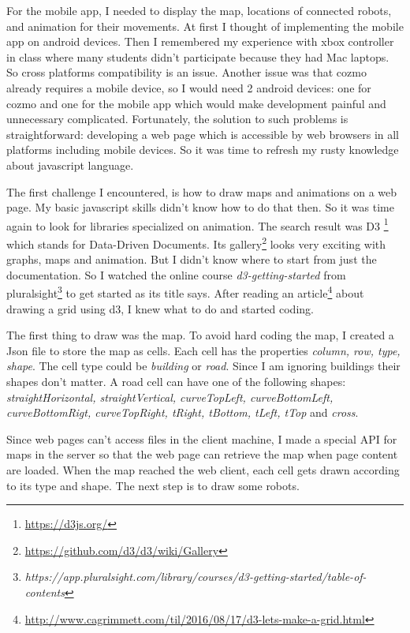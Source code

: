 \documentclass[12pt,a4paper]{article}
\begin{document}
For the mobile app, I needed to display the map, locations of connected robots, and animation for their movements. At first I thought of implementing the mobile app on android devices. Then I remembered my experience with xbox controller in class where many students didn't participate because they had Mac laptops. So cross platforms compatibility is an issue.  Another issue was that cozmo already requires a mobile device, so I would need 2 android devices: one for cozmo and one for the mobile app which would make development painful and unnecessary complicated. Fortunately,  the solution to such problems is straightforward: developing a web page which is accessible by web browsers in all platforms including mobile devices. So it was time to refresh my rusty knowledge about javascript language. 


The first challenge I encountered, is how to draw maps and animations on a web page. My basic javascript skills didn't know how to do that then. So it was time again to look for libraries specialized on animation. The search result was D3 \footnote{\url{https://d3js.org/}} which stands for Data-Driven Documents. Its gallery\footnote{\url{https://github.com/d3/d3/wiki/Gallery}} looks very exciting with graphs, maps and animation. But I didn't know where to start from just the documentation. So I watched the online course \textit{d3-getting-started} from pluralsight\footnote{\textit{https://app.pluralsight.com/library/courses/d3-getting-started/table-of-contents}} to get started as its title says. After reading an article\footnote{\url{http://www.cagrimmett.com/til/2016/08/17/d3-lets-make-a-grid.html}} about drawing a grid using d3, I knew what to do and started coding. 


The first thing to draw was the map. To avoid hard coding the map, I created a Json file to store the map as cells. Each cell has the properties \textit{column, row, type, shape}. The cell type could be \textit{building} or \textit{road}. Since I am ignoring buildings their shapes don't matter. A road cell can have one of the following shapes: \textit{straightHorizontal, straightVertical, curveTopLeft, curveBottomLeft, curveBottomRigt, curveTopRight, tRight, tBottom, tLeft, tTop} and \textit{cross}.

Since web pages can't access files in the client machine, I made a special API for maps in the server so that the web page can retrieve the map when page content are loaded. When the map reached the web client, each cell gets drawn according to its type and shape. The next step is to draw some robots. 
\end{document}
